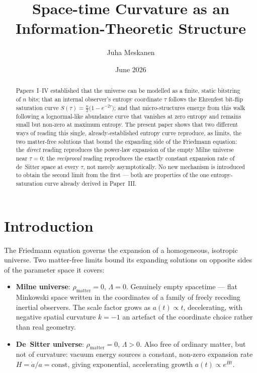 \documentclass[11pt]{article}
\title{Space-time Curvature as an Information-Theoretic Structure}
\author{Juha Meskanen}
\date{June 2026}
\begin{document}
\maketitle

\begin{abstract}
Papers~I--IV \cite{meskanen2001, meskanen2002, meskanen2003, meskanen2026iv}
established that the universe can be modelled as a finite, static
bitstring of $n$ bits; that an internal observer's entropy coordinate
$\tau$ follows the Ehrenfest bit-flip saturation curve
$S(\tau) = \tfrac{n}{2}\bigl(1-e^{-2\tau}\bigr)$; and that micro-structures
emerge from this walk following a lognormal-like abundance curve that
vanishes at zero entropy and remains small but non-zero at maximum
entropy. The present paper shows that two different ways of reading this
single, already-established entropy curve reproduce, as limits, the two
matter-free solutions that bound the expanding side of the Friedmann
equation: the \emph{direct} reading reproduces the power-law expansion of
the empty Milne universe near $\tau=0$; the \emph{reciprocal} reading
reproduces the exactly constant expansion rate of de~Sitter space at
every $\tau$, not merely asymptotically. No new mechanism is introduced
to obtain the second limit from the first --- both are properties of the
one entropy-saturation curve already derived in Paper~III.
\end{abstract}

\tableofcontents
\newpage

\section{Introduction}
\label{sec:intro}

The Friedmann equation governs the expansion of a homogeneous, isotropic
universe. Two matter-free limits bound its expanding solutions on
opposite sides of the parameter space it covers:

\begin{itemize}
  \item \textbf{Milne universe}: $\rho_{\text{matter}}=0$,
        $\Lambda=0$. Genuinely empty spacetime --- flat Minkowski space
        written in the coordinates of a family of freely receding
        inertial observers. The scale factor grows as $a(t)\propto t$,
        decelerating, with negative spatial curvature $k=-1$ an artefact
        of the coordinate choice rather than real geometry.
  \item \textbf{De~Sitter universe}: $\rho_{\text{matter}}=0$,
        $\Lambda>0$. Also free of ordinary matter, but not of curvature:
        vacuum energy sources a constant, non-zero expansion rate
        $H=\dot a/a=\text{const}$, giving exponential, accelerating
        growth $a(t)\propto e^{Ht}$.
\end{itemize}
\end{document}
